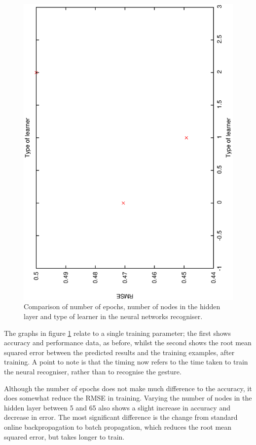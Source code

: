 \documentclass[12pt,a4,notitlepage]{report}
\renewcommand{\_}{\texttt{\symbol{95}}}
\newcommand{\<}{\texttt{\symbol{60}}}
\renewcommand{\>}{\texttt{\symbol{62}}}
\begin{document}
\begin{figure}
\includegraphics[scale=0.3,angle=-90]{results/neural_err/n_learner.ps}
\caption{Comparison of number of epochs, number of nodes in the hidden layer and type of learner in the neural networks recogniser.}
\label{n_intparameters}
\end{figure}

The graphs in figure \ref{n_intparameters} relate to a single training parameter; the first shows accuracy and performance data, as before, whilst the second shows the root mean squared error between the predicted results and the training examples, after training. A point to note is that the timing now refers to the time taken to train the neural recogniser, rather than to recognise the gesture.

Although the number of epochs does not make much difference to the accuracy, it does somewhat reduce the RMSE in training. Varying the number of nodes in the hidden layer between 5 and 65 also shows a slight increase in accuracy and decrease in error. The most significant difference is the change from standard online backpropagation to batch propagation, which reduces the root mean squared error, but takes longer to train.
\end{document}
